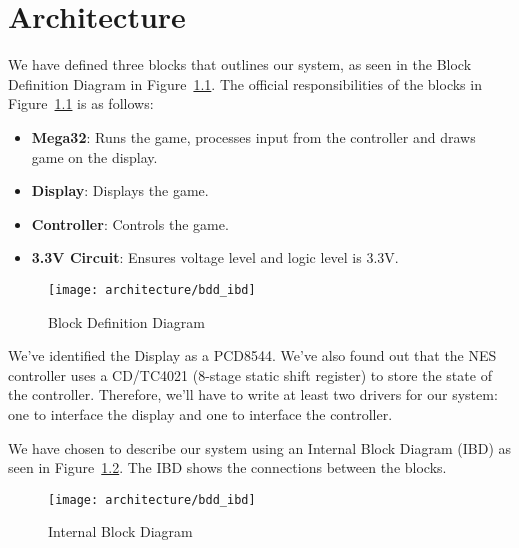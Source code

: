 \chapter{Architecture}

We have defined three blocks that outlines our system, as seen in the Block Definition Diagram in Figure~\ref{fig:bdd}. The official responsibilities of the blocks in Figure~\ref{fig:bdd} is as follows:

\begin{itemize}
	\item \textbf{Mega32}: Runs the game, processes input from the controller and draws game on the display.
	\item \textbf{Display}: Displays the game.
	\item \textbf{Controller}: Controls the game.
	\item \textbf{3.3V Circuit}: Ensures voltage level and logic level is 3.3V.
\end{itemize}

\begin{figure}
\centering
\texttt{[image: architecture/bdd\_ibd]}
\caption{Block Definition Diagram}
\label{fig:bdd}
\end{figure}

We've identified the Display as a PCD8544. We've also found out that the NES controller uses a CD/TC4021 (8-stage static shift register) to store the state of the controller. Therefore, we'll have to write at least two drivers for our system: one to interface the display and one to interface the controller.

We have chosen to describe our system using an Internal Block Diagram (IBD) as seen in Figure~\ref{fig:ibd}. The IBD shows the connections between the blocks.

\begin{figure}
\centering
\texttt{[image: architecture/bdd\_ibd]}
\caption{Internal Block Diagram}
\label{fig:ibd}
\end{figure}



